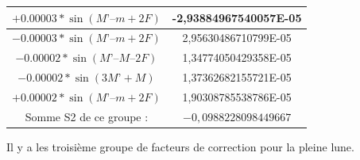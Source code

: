 \begin{table}[H]
\begin{center}
\begin{tabular}{|c|c|}
		\hline
		$+0.00003   * \sin (M’ – m + 2F )$ & -2,93884967540057E-05\\ 
		\hline
		$-0.00003 * \sin (M’ – m + 2F )$ & 2,95630486710799E-05\\ 
		\hline
		$-0.00002    * \sin (M’ – M – 2F)$ & 1,34774050429358E-05\\ 
		\hline
		$-0.00002    * \sin (3M’ + M )$ & 1,37362682155721E-05\\ 
		\hline
		$+0.00002  * \sin (M’ – m + 2F )$ & 1,90308785538786E-05\\ 
		\hline
		Somme S2 de ce groupe :& $-0,0988228098449667$\\ 
		\hline
		\end{tabular}
	\end{center} 
\end{table}
Il y a les troisième groupe de facteurs de correction pour  la pleine lune.\\

